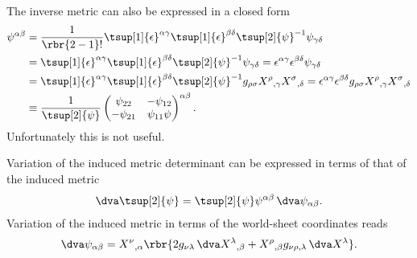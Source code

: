 \documentclass[a4paper,11pt]{article}
\begin{document}
The inverse metric can also be expressed in a closed form
\begin{align}
\psi^{\alpha\beta} &= \frac{1}{\rbr{2-1}!} 
	\tsup[1]{\epsilon}^{\alpha\gamma} \tsup[1]{\epsilon}^{\beta\delta} 
	\tsup[2]{\psi}^{-1} \psi_{\gamma\delta}
\nonumber \\
&=
	\tsup[1]{\epsilon}^{\alpha\gamma} \tsup[1]{\epsilon}^{\beta\delta} 
	\tsup[2]{\psi}^{-1} \psi_{\gamma\delta} =
	\epsilon^{\alpha\gamma} \epsilon^{\beta\delta} \psi_{\gamma\delta}
\\
&=
\tsup[1]{\epsilon}^{\alpha\gamma} \tsup[1]{\epsilon}^{\beta\delta} 
	\tsup[2]{\psi}^{-1} g_{\rho\sigma} 
	X^{\rho}{}_{,\gamma} X^{\sigma}{}_{,\delta} =
\epsilon^{\alpha\gamma} \epsilon^{\beta\delta} g_{\rho\sigma} 
	X^{\rho}{}_{,\gamma} X^{\sigma}{}_{,\delta}
\\
&\equiv \frac{1}{\tsup[2]{\psi}}
\begin{pmatrix}
\psi_{22} & -\psi_{12} \\ -\psi_{21} & \psi_{11}\psi
\end{pmatrix}^{\alpha\beta}.
\end{align}
Unfortunately this is not useful.

Variation of the induced metric determinant can be expressed in terms of that 
of the induced metric
\begin{align}
\dva \tsup[2]{\psi} = \tsup[2]{\psi} \psi^{\alpha\beta}\,\dva 
	\psi_{\alpha\beta}.
\end{align}
Variation of the induced metric in terms of the world-sheet coordinates reads 
\begin{align}
\dva \psi_{\alpha\beta} = X^{\nu}{}_{,\alpha} \rbr{
	2 g_{\nu\lambda}\, \dva X^{\lambda}{}_{,\beta} + 
	X^{\rho}{}_{,\beta} g_{\nu\rho,\lambda}\, \dva X^{\lambda}}.
\end{align}
\end{document}
